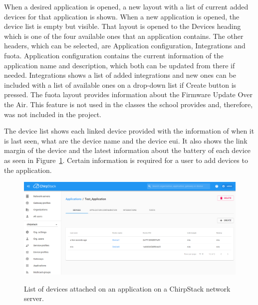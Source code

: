 When a desired application is opened, a new layout with a list of current added devices for that application is shown.
When a new application is opened, the device list is empty but visible.
That layout is opened to the Devices heading which is one of the four available ones that an application contains.
The other headers, which can be selected, are Application configuration, Integrations and \gls{fuota}.
Application configuration contains the current information of the application name and description, which both can be updated from there if needed.
Integrations shows a list of added integrations and new ones can be included with a list of available ones on a drop-down list if Create button is pressed.
The \gls{fuota} layout provides information about the Firmware Update Over the Air.
This feature is not used in the classes the school provides and, therefore, was not included in the project. 

The device list shows each linked device provided with the information of when it is last seen, what are the device name and the device \gls{eui}.
It also shows the link margin of the device and the latest information about the battery of each device as seen in Figure~\ref{fig:ChirpStack_application}.
Certain information is required for a user to add devices to the application.

\begin{figure}[ht]
  \centering
  {\includegraphics[width=\textwidth]{illustration/ChirpStack_application.png}}
  \caption{List of devices attached on an application on a ChirpStack network server.}
  \label{fig:ChirpStack_application}
\end{figure}

